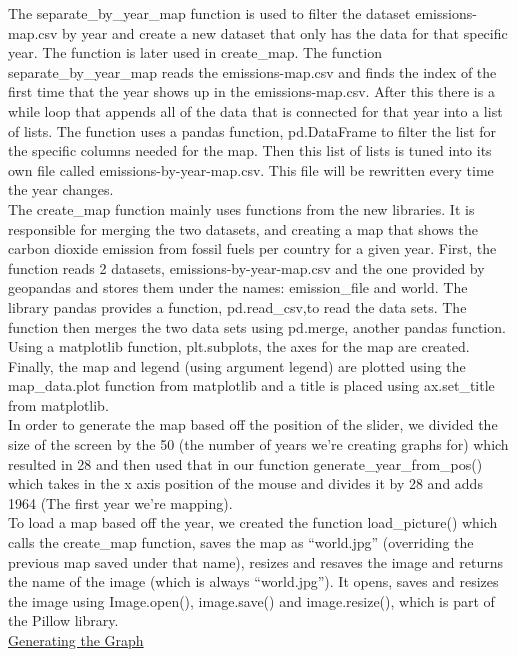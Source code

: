 \documentclass[fontsize=11pt]{article}
\begin{document}
 The separate\_by\_year\_map function is used to filter the dataset emissions-map.csv by year and create a new dataset that only has the data for that specific year. The function is later used in create\_map. The function separate\_by\_year\_map reads the emissions-map.csv and finds the index of the first time that the year shows up in the emissions-map.csv. After this there is a while loop that appends all of the data that is connected for that year into a list of lists. The function uses a pandas function, pd.DataFrame to filter the list for the specific columns needed for the map. Then this list of lists is tuned into its own file called emissions-by-year-map.csv. This file will be rewritten every time the year changes.  \\
The create\_map function mainly uses functions from the new libraries. It is responsible for merging the two datasets, and creating a map that shows the carbon dioxide emission from fossil fuels per country for a given year. First, the function reads 2 datasets, emissions-by-year-map.csv and the one provided by geopandas and stores them under the names: emission\_file and world. The library pandas provides a function,  pd.read\_csv,to read the data sets. The function then merges the two data sets using pd.merge, another pandas function. Using a matplotlib function, plt.subplots, the axes for the map are created. Finally, the map and legend (using argument legend) are plotted using the map\_data.plot function from matplotlib and a title is placed using ax.set\_title from matplotlib. \\
In order to generate the map based off the position of the slider, we divided the size of the screen by the 50 (the number of years we’re creating graphs for) which resulted in 28 and then used that in our function generate\_year\_from\_pos() which takes in the x axis position of the mouse and divides it by 28 and adds 1964 (The first year we’re mapping). \\
To load a map based off the year, we created the function load\_picture() which calls the create\_map function, saves the map as “world.jpg”  (overriding the previous map saved under that name), resizes and resaves the image and returns the name of the image (which is always “world.jpg”). It opens, saves and resizes the image using Image.open(), image.save() and image.resize(), which is part of the Pillow library. \\

\underline{Generating the Graph} \\
\end{document}

